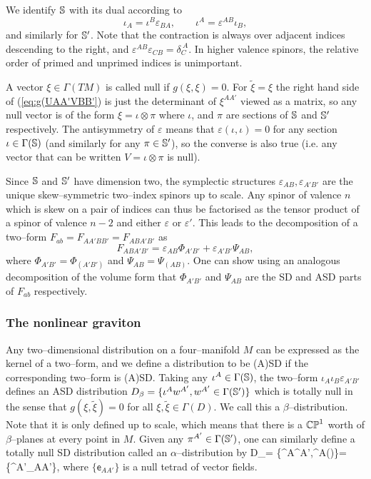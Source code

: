 We identify $\mathbb{S}$ with its dual according to
\[
\iota_A=\iota^B\varepsilon_{BA},\qquad \iota^A=\varepsilon^{AB}\iota_B,
\]
and similarly for $\mathbb{S}'$. Note that the contraction is always over adjacent indices descending to the right, and $\varepsilon^{AB}\varepsilon_{CB}=\delta_C^{\ A}$. In higher valence spinors, the relative order of primed and unprimed indices is unimportant.

A vector $\xi\in \Gamma(TM)$ is called null if $g(\xi, \xi)=0$. For $\tilde{\xi}=\xi$ the right hand side of (\ref{eq:g(UAA'VBB'}) is just the determinant of $\xi^{AA'} $ viewed as a matrix, so any null vector is of the form
$\xi=\iota \otimes \pi$ where $\iota$, and $\pi$ are sections of
$\mathbb{S}$ and $\mathbb{S}'$ respectively. The antisymmetry of $\varepsilon$ means that $\varepsilon(\iota,\iota)=0$ for any section $\iota\in\Gamma(\mathbb{S})$ (and similarly for any $\pi\in\mathbb{S}'$), so the converse is also true (i.e. any vector that can be written $V=\iota\otimes \pi$ is null).

Since $\mathbb{S}$ and $\mathbb{S}'$ have dimension two, the symplectic structures $\varepsilon_{AB},\varepsilon_{A'B'}$ are the unique skew--symmetric two--index spinors up to scale. Any spinor of valence $n$ which is skew on a pair of indices can thus be factorised as the tensor product of a spinor of valence $n-2$ and either $\varepsilon$ or $\varepsilon'$. This leads to the decomposition of a two--form $F_{ab}=F_{AA'BB'}=F_{ABA'B'}$ as
\[
F_{ABA'B'} = \varepsilon_{AB}\Phi_{A'B'} + \varepsilon_{A'B'}\Psi_{AB},
\]
where $\Phi_{A'B'}=\Phi_{(A'B')}$ and $\Psi_{AB}=\Psi_{(AB)}$. One can show using an analogous decomposition of the volume form that $\Phi_{A'B'}$ and $\Psi_{AB}$ are the SD and ASD parts of $F_{ab}$ respectively.

\subsubsection{The nonlinear graviton}
Any two--dimensional distribution on a four--manifold $M$ can be expressed as the kernel of a two--form, and we define a distribution to be (A)SD if the corresponding two--form is (A)SD. Taking any $\iota^A\in\Gamma(\mathbb{S})$, the two--form $\iota_A\iota_B\varepsilon_{A'B'}$ defines an ASD distribution $D_\beta=\{\iota^Aw^{A'},w^{A'}\in\Gamma(\mathbb{S}')\}$ which is totally null in the sense that $g(\xi,\tilde{\xi})=0$ for all $\xi,\tilde{\xi}\in\Gamma(D)$. We call this a $\beta$--distribution. Note that it is only defined up to scale, which means that there is a $\mathbb{CP}^1$ worth of $\beta$--planes at every point in $M$. Given any $\pi^{A'}\in\Gamma(\mathbb{S}')$, one can similarly define a totally null SD distribution called an $\alpha$--distribution by
\be \label{eq:alpha_dist}
D_\alpha = \{\iota^A\pi^{A'},\iota^{A}\in\Gamma(\spp)\}=\{\pi^{A'}_{AA'}\},
\ee
where $\{\mathsf{e}_{AA'}\}$ is a null tetrad of vector fields.

